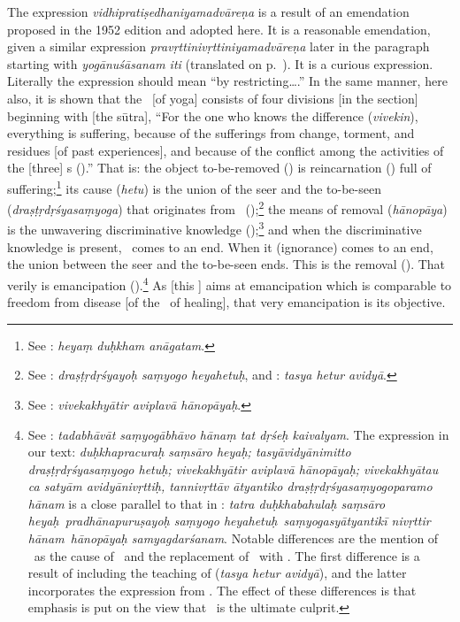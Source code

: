 {The expression \emph{vidhi\-prati\-ṣe\-dha\-niyama\-dvāreṇa} is a result of an emendation proposed in the 1952 edition and adopted here.  It is a reasonable emendation, given a similar expression \emph{pra\-vṛtti\-ni\-vṛtti\-ni\-yama\-dvā\-re\-ṇa} later in the paragraph starting with \emph{yogānuśāsanam iti}  (translated on p.~\pageref{YGNSSM}).  It is a curious expression.  Literally the expression should mean ``by restricting\ldots.''}  In the same manner, here also, it is shown that the \sastra\ [of yoga] consists of four divisions [in the section] beginning with [the {sūtra}], ``For the one who knows the difference (\emph{vivekin}), everything is suffering, because of the sufferings from change, torment, and residues [of past experiences], and because of the conflict among the activities of the [three] \guna s ().''  That is: the object to-be-removed (\heya) is reincarnation (\samsara) full of suffering;\footnote{See : \emph{heyaṃ duḥkham anāgatam}.} its cause (\emph{hetu}) is the union of the seer and the to-be-seen (\emph{draṣṭṛdṛśyasaṃyoga}) that originates from \ignorance\ (\avidya);\footnote{See : \emph{draṣṭṛdṛśyayoḥ saṃyogo heyahetuḥ}, and : \emph{tasya hetur avidyā}.} the means of removal (\emph{hānopāya}) is the unwavering discriminative knowledge (\vivekakhyati);\footnote{See : \emph{viveka\-khyāti\-r a\-vi\-pla\-vā hāno\-pāyaḥ}.} and when the discriminative knowledge is present, \ignorance\ comes to an end. When it (ignorance) comes to an end, the union between the seer and the to-be-seen ends. This is the removal (\hana).  That verily is emancipation (\kaivalya).\footnote{See :
  \emph{tadabhāvāt saṃyogābhāvo hānaṃ tat dṛśeḥ
    kaivalyam}.  The expression in our text: \emph{duḥkha\-pra\-curaḥ saṃsāro heyaḥ; tasyā\-vidyā\-nimitto draṣṭṛ\-dṛśya\-saṃyogo hetuḥ; vi\-ve\-ka\-khyā\-ti\-r a\-vi\-pla\-vā hā\-no\-pā\-yaḥ; vi\-ve\-ka\-khyā\-tau ca sa\-tyām a\-vi\-dyā\-ni\-vṛ\-ttiḥ, ta\-nni\-vṛ\-ttā\-v ā\-tya\-nti\-ko dra\-ṣṭṛ\-dṛśya\-saṃ\-yogo\-pa\-ra\-mo hā\-nam} is a close parallel to that in : \emph{tatra duḥ\-kha\-ba\-hu\-laḥ saṃ\-sā\-ro
    he\-yaḥ\dd\ pra\-dhā\-na\-pu\-ru\-ṣa\-yoḥ saṃ\-yo\-go he\-ya\-he\-tuḥ\dd\
    saṃ\-yo\-ga\-syā\-tya\-nti\-kī ni\-vṛ\-tti\-r hā\-na\-m\dd\ hā\-no\-pā\-yaḥ
    sa\-mya\-gda\-rśa\-nam\dd}.  Notable differences are the mention of \avidya\ as the cause of \samyoga\ and the replacement of \samyagdarsana\ with \vivekakhyati.  The first difference is a result of including the teaching of  (\emph{tasya hetur avidyā}), and the latter incorporates the expression from .  The effect of these differences is that emphasis is put on the view that \avidya\ is the ultimate culprit.} As [this \sastra] aims at emancipation
which is comparable to freedom from disease [of the \sastra\ of healing], that very emancipation is its objective.

